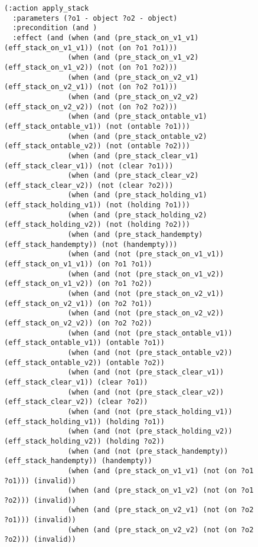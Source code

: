 \documentclass[runningheads]{llncs}
\begin{document}
\begin{itemize}
\begin{enumerate}
\begin{figure}[hbt!]
\begin{center}
\begin{scriptsize}
\begin{verbatim}
(:action apply_stack
  :parameters (?o1 - object ?o2 - object)
  :precondition (and )
  :effect (and (when (and (pre_stack_on_v1_v1) (eff_stack_on_v1_v1)) (not (on ?o1 ?o1)))
               (when (and (pre_stack_on_v1_v2) (eff_stack_on_v1_v2)) (not (on ?o1 ?o2)))
               (when (and (pre_stack_on_v2_v1) (eff_stack_on_v2_v1)) (not (on ?o2 ?o1)))
               (when (and (pre_stack_on_v2_v2) (eff_stack_on_v2_v2)) (not (on ?o2 ?o2)))
               (when (and (pre_stack_ontable_v1) (eff_stack_ontable_v1)) (not (ontable ?o1)))
               (when (and (pre_stack_ontable_v2) (eff_stack_ontable_v2)) (not (ontable ?o2)))
               (when (and (pre_stack_clear_v1) (eff_stack_clear_v1)) (not (clear ?o1)))
               (when (and (pre_stack_clear_v2) (eff_stack_clear_v2)) (not (clear ?o2)))
               (when (and (pre_stack_holding_v1) (eff_stack_holding_v1)) (not (holding ?o1)))
               (when (and (pre_stack_holding_v2) (eff_stack_holding_v2)) (not (holding ?o2)))
               (when (and (pre_stack_handempty) (eff_stack_handempty)) (not (handempty)))
               (when (and (not (pre_stack_on_v1_v1)) (eff_stack_on_v1_v1)) (on ?o1 ?o1))
               (when (and (not (pre_stack_on_v1_v2)) (eff_stack_on_v1_v2)) (on ?o1 ?o2))
               (when (and (not (pre_stack_on_v2_v1)) (eff_stack_on_v2_v1)) (on ?o2 ?o1))
               (when (and (not (pre_stack_on_v2_v2)) (eff_stack_on_v2_v2)) (on ?o2 ?o2))
               (when (and (not (pre_stack_ontable_v1)) (eff_stack_ontable_v1)) (ontable ?o1))
               (when (and (not (pre_stack_ontable_v2)) (eff_stack_ontable_v2)) (ontable ?o2))
               (when (and (not (pre_stack_clear_v1)) (eff_stack_clear_v1)) (clear ?o1))
               (when (and (not (pre_stack_clear_v2)) (eff_stack_clear_v2)) (clear ?o2))
               (when (and (not (pre_stack_holding_v1)) (eff_stack_holding_v1)) (holding ?o1))
               (when (and (not (pre_stack_holding_v2)) (eff_stack_holding_v2)) (holding ?o2))
               (when (and (not (pre_stack_handempty)) (eff_stack_handempty)) (handempty))
               (when (and (pre_stack_on_v1_v1) (not (on ?o1 ?o1))) (invalid))
               (when (and (pre_stack_on_v1_v2) (not (on ?o1 ?o2))) (invalid))
               (when (and (pre_stack_on_v2_v1) (not (on ?o2 ?o1))) (invalid))
               (when (and (pre_stack_on_v2_v2) (not (on ?o2 ?o2))) (invalid))

\end{verbatim}
\end{scriptsize}
\end{center}
\end{figure}
\end{enumerate}
\end{itemize}
\end{document}
